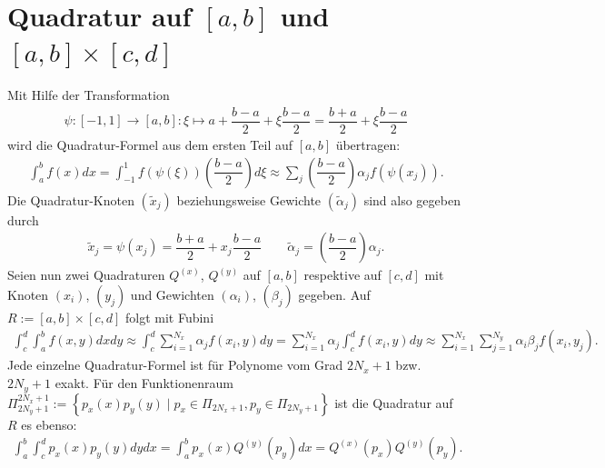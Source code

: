 \documentclass[french, 12pt, a4paper, onesided]{scrartcl}
\theoremstyle{plain}
\theoremstyle{definition}
\theoremstyle{remark}
\begin{document}
\section{Quadratur auf $ [a,b] $ und $ [a,b]\times[c,d] $ }
Mit Hilfe der Transformation
\begin{align*}
	\psi:[-1,1]\rightarrow[a,b]:\xi\mapsto a+\dfrac{b-a}{2}+\xi\dfrac{b-a}{2}=\dfrac{b+a}{2}+\xi\dfrac{b-a}{2}
\end{align*}
wird die Quadratur-Formel aus dem ersten Teil auf $ [a,b] $ übertragen:
\begin{align*}
	\int_{a}^{b}f(x)dx=\int_{-1}^{1}f(\psi(\xi))\left( \dfrac{b-a}{2} \right) d\xi \approx \sum_{j}\left( \dfrac{b-a}{2} \right)\alpha_jf(\psi(x_j)).
\end{align*}
Die Quadratur-Knoten $ (\tilde{x}_j) $ beziehungsweise Gewichte $ (\tilde{\alpha}_j) $ sind also gegeben durch
\begin{align}
	\tilde{x}_j=\psi(x_j)=\dfrac{b+a}{2}+x_j\dfrac{b-a}{2} \qquad \tilde{\alpha}_j=\left( \dfrac{b-a}{2} \right)\alpha_j.
\end{align}
Seien nun zwei Quadraturen $ Q^{(x)} $, $ Q^{(y)} $ auf $ [a,b] $ respektive auf $ [c,d] $ mit Knoten $ (x_i) $, $ (y_j) $  und Gewichten $ (\alpha_i) $, $ (\beta_j) $ gegeben. Auf $ R:=[a,b]\times[c,d] $ folgt mit Fubini
\begin{align*}
	\int_{c}^{d}\int_{a}^{b}f(x,y)dxdy \approx \int_{c}^{d} \sum_{i=1}^{N_x} \alpha_j f(x_i,y)dy = \sum_{i=1}^{N_x} \alpha_j \int_{c}^{d}f(x_i,y)dy \approx \sum_{i=1}^{N_x}\sum_{j=1}^{N_y}\alpha_i \beta_j f(x_i,y_j).
\end{align*}
Jede einzelne Quadratur-Formel ist für Polynome vom Grad $ 2N_x+1 $ bzw. $ 2N_y+1 $ exakt. Für den Funktionenraum $ \Pi_{2N_y+1}^{2N_x+1}:=\left\lbrace p_x(x)p_y(y) \mid  p_x\in\Pi_{2N_x+1}, p_y\in\Pi_{2N_y+1} \right\rbrace  $ ist die Quadratur auf  $ R $ es ebenso:
\begin{align*}
	\int_{a}^{b}\int_{c}^{d}p_x(x)p_y(y)dydx=\int_{a}^{b}p_x(x)Q^{(y)}(p_y)dx=Q^{(x)}(p_x)Q^{(y)}(p_y).
\end{align*}
\end{document}
